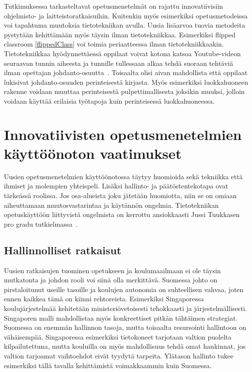 \documentclass[utf8,bachelor]{gradu3}
\begin{document}
Tutkimuksessa tarkasteltavat opetusmenetelmät on rajattu innovatiivisiin ohjelmisto- ja laitteistoratkaisuihin. Kuitenkin myös esimerkiksi opetusmetodeissa voi tapahtuma muutoksia tietotekniikan avulla. Uusia lisäarvoa tuovia metodeita pystytään kehittämään myös täysin ilman tietotekniikkaa. Esimerkiksi flipped classroom \ref{flippedClass} voi toimia periaatteessa ilman tietotekniikkaakin. Tietotekniikkaa hyödynnettäessä oppilaat voivat kotona katsoa Youtube-videon seuraavan tunnin aiheesta ja tunnille tullessaan alkaa tehdä suoraan tehtäviä ilman opettajan johdanto-osuutta~\parencite[][]{flipped}. Toisaalta olisi aivan mahdollista että oppilaat lukisivat johdanto-osuuden perinteisestä kirjasta. Myös esimerkiksi luokkahuoneen rakenne voidaan muuttaa perinteisestä pulpettimallisesta joksikin muuksi, jolloin voidaan käyttää erilaisia työtapoja kuin perinteisessä luokkahuoneessa.

\section{Innovatiivisten opetusmenetelmien käyttöönoton vaatimukset}
Uusien opetusmenetelmien käyttöönotossa täytyy huomioida sekä tekniikka että ihmiset ja molempien yhteispeli. Lisäksi hallinto- ja päätöstentekotapa ovat tärkeässä roolissa. Jos osa-alueista joku jätetään huomiotta, niin se on omiaan aiheuttamaan muutosvastarintaa ja käytännön ongelmia. Tietotekniikan opetuskäyttöön liittyvistä ongelmista on kerrottu ansiokkaasti Jussi Tuukkasen pro gradu tutkielmassa~\parencite[][s. 5-30]{kemia}.

\subsection{Hallinnolliset ratkaisut}
Uusien ratkaisujen tuominen opetukseen ja koulumaailmaan ei ole täysin mutkatonta ja johdon rooli voi siinä olla merkittävä. Suomessa johto on pirstaloitunut useille tasoille ja koulujen autonomia on suhteellisen vahvaa, joten ennen kaikkea tämä on kiinni rehtoreista. Esimerkiksi Singaporessa koulujärjestelmää kehitetään ministeriövetoisesti tehokkaasti ja järjestelmällisesti. Singaporen malli mahdollistaa myös konkreettiset pitkän tähtäimen strategiat. Suomessa on enemmän hallinnon tasoja, mutta toisaalta resursointi hallintoon on vähäisempää. Singaporessa esimerkiksi tietokoneet tarjotaan valtion puolelta kilpailutettuna, mutta kouluilla on myös mahdollisuus tehdä omat hankinnat, jos valtion tarjoamat vaihtoehdot eivät tyydytä tarpeita. Ylätason hallinto tukee esimerkiksi tällä tavalla kehittämistä voimakkaammin kuin Suomessa.~\parencite[][]{koulunArki}
\end{document}
